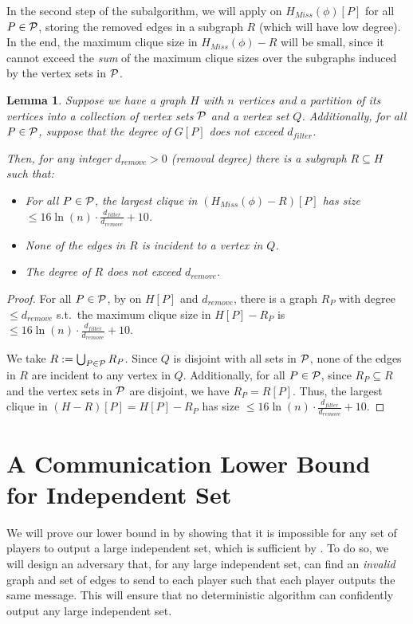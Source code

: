 \documentclass[11pt]{article}
\newtheorem{lemma}{Lemma}[section]
\theoremstyle{definition}
\renewcommand{\leq}{\leqslant}
\renewcommand{\le}{\leq}
\begin{document}
In the second step of the subalgorithm, we will apply  on $H_{Miss}(\phi)[P]$ for all $P\in \mathcal{P}$, storing the removed edges in a subgraph $R$ (which will have low degree). In the end, the maximum clique size in $H_{Miss}(\phi)-R$ will be small, since it cannot exceed the \textit{sum} of the maximum clique sizes over the subgraphs induced by the vertex sets in $\mathcal{P}$.

\begin{lemma}\label{algo-second-step}
Suppose we have a graph $H$ with $n$ vertices and a partition of its vertices into a collection of vertex sets $\mathcal{P}$ and a vertex set $Q$. Additionally, for all $P\in \mathcal{P}$, suppose that the degree of $G[P]$ does not exceed $d_{filter}$.

Then, for any integer $d_{remove}>0$ (removal degree) there is a subgraph $R\subseteq H$ such that: 
\begin{itemize}
\item For all $P\in \mathcal{P}$, the largest clique in $(H_{Miss}(\phi)-R)[P]$ has size $\le 16\ln(n)\cdot \frac{d_{filter}}{d_{remove}}+10$. 
\item None of the edges in $R$ is incident to a vertex in $Q$. 
\item The degree of $R$ does not exceed $d_{remove}$. 
\end{itemize}
\end{lemma}
\begin{proof}
For all $P\in \mathcal{P}$, by  on $H[P]$ and $d_{remove}$, there is a graph $R_P$ with degree $\le d_{remove}$ s.t.\ the maximum clique size in $H[P]-R_P$ is $\le 16\ln(n)\cdot\frac{d_{filter}}{d_{remove}}+10$. 

We take $R:=\bigcup_{P\in \mathcal{P}}R_P$. Since $Q$ is disjoint with all sets in $\mathcal{P}$, none of the edges in $R$ are incident to any vertex in $Q$. Additionally, for all $P\in \mathcal{P}$, since $R_P\subseteq R$ and the vertex sets in $\mathcal{P}$ are disjoint, we have $R_P=R[P]$. Thus, the largest clique in $(H-R)[P]=H[P]-R_P$ has size $\le 16\ln(n)\cdot\frac{d_{filter}}{d_{remove}}+10$.
\end{proof}

\section{A Communication Lower Bound for Independent Set}

We will prove our lower bound in  by showing that it is impossible for any set of players to output a large independent set, which is sufficient by . To do so, we will design an adversary that, for any large independent set, can find an \textit{invalid} graph and set of edges to send to each player such that each player outputs the same message. This will ensure that no deterministic algorithm can confidently output any large independent set. 
\end{document}

